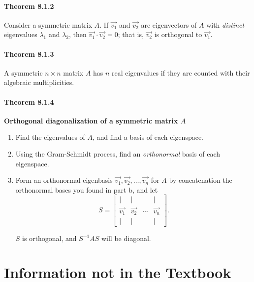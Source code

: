 \documentclass{report}
\begin{document}
\subsubsection*{Theorem 8.1.2}
\par\noindent Consider a symmetric matrix $A$. If $\vec{v_{1}}$ and $\vec{v_{2}}$ are eigenvectors of $A$ with \textit{distinct} eigenvalues $\lambda{}_{1}$ and $\lambda{}_{2}$, then $\vec{v_{1}}\cdot{}\vec{v_{2}}=0$; that is, $\vec{v_{2}}$ is orthogonal to $\vec{v_{1}}$.
\subsubsection*{Theorem 8.1.3}
\par\noindent A symmetric $n\times{}n$ matrix $A$ has $n$ real eigenvalues if they are counted with their algebraic multiplicities.
\subsubsection*{Theorem 8.1.4}
\par\noindent\textbf{Orthogonal diagonalization of a symmetric matrix $A$}
\renewcommand{\labelenumi}{\textbf{\alph{enumi}.}}
\begin{enumerate}
\item Find the eigenvalues of $A$, and find a basis of each eigenspace.
\item Using the Gram-Schmidt process, find an \textit{orthonormal} basis of each eigenspace.
\item Form an orthonormal eigenbasis $\vec{v_{1}},\vec{v_{2}},\ldots{},\vec{v_{n}}$ for $A$ by concatenation the orthonormal bases you found in part b, and let
\[S=\left[\begin{array}{cccc}|&|&&|\\{} \vec{v_{1}}&\vec{v_{2}}&\cdots{}&\vec{v_{n}}\\ |&|&&|\end{array}\right].\]
\par\noindent $S$ is orthogonal, and $S^{-1}AS$ will be diagonal.
\end{enumerate}

\chapter{Information not in the Textbook}
\end{document}
